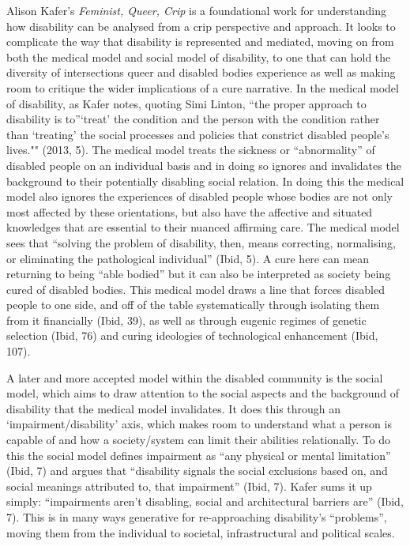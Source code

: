 Alison Kafer's \emph{Feminist, Queer, Crip} is a foundational work for
understanding how disability can be analysed from a crip perspective and
approach. It looks to complicate the way that disability is represented
and mediated, moving on from both the medical model and social model of
disability, to one that can hold the diversity of intersections queer
and disabled bodies experience as well as making room to critique the
wider implications of a cure narrative. In the medical model of
disability, as Kafer notes, quoting Simi Linton, ``the proper approach
to disability is to''`treat' the condition and the person with the
condition rather than `treating' the social processes and policies that
constrict disabled people's lives."" (2013, 5). The medical model treats
the sickness or ``abnormality'' of disabled people on an individual
basis and in doing so ignores and invalidates the background to their
potentially disabling social relation. In doing this the medical model
also ignores the experiences of disabled people whose bodies are not
only most affected by these orientations, but also have the affective
and situated knowledges that are essential to their nuanced affirming
care. The medical model sees that ``solving the problem of disability,
then, means correcting, normalising, or eliminating the pathological
individual'' (Ibid, 5). A cure here can mean returning to being ``able
bodied'' but it can also be interpreted as society being cured of
disabled bodies. This medical model draws a line that forces disabled
people to one side, and off of the table systematically through
isolating them from it financially (Ibid, 39), as well as through
eugenic regimes of genetic selection (Ibid, 76) and curing ideologies of
technological enhancement (Ibid, 107).

A later and more accepted model within the disabled community is the
social model, which aims to draw attention to the social aspects and the
background of disability that the medical model invalidates. It does
this through an `impairment/disability' axis, which makes room to
understand what a person is capable of and how a society/system can
limit their abilities relationally. To do this the social model defines
impairment as ``any physical or mental limitation'' (Ibid, 7) and argues
that ``disability signals the social exclusions based on, and social
meanings attributed to, that impairment'' (Ibid, 7). Kafer sums it up
simply: ``impairments aren't disabling, social and architectural
barriers are'' (Ibid, 7). This is in many ways generative for
re-approaching disability's ``problems'', moving them from the
individual to societal, infrastructural and political scales.


